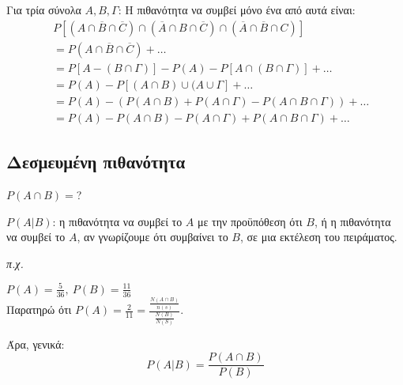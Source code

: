 \documentclass[11pt,a4paper,titlepage,draft]{article}
\begin{document}
\subsubsection{}
Για τρία σύνολα \(A,B, \Gamma \): Η πιθανότητα να συμβεί μόνο ένα από αυτά είναι:
\begin{align*}
& P\left[
\left( A \cap \overline{B} \cap \overline{C} \right) \cap
\left( \overline{A} \cap B \cap \overline{C} \right) \cap
\left( \overline{A} \cap \overline{B} \cap C \right) \right] \\ &=
P(A \cap \overline{B} \cap \overline{C}) + \dots \\ &=
P\left[ A - (B \cap \Gamma )\right]
-P(A)-P \left[ A \cap (B \cap \Gamma ) \right] + \dots
\\ &=
P(A) - P \left[ (A \cap B) \cup (A \cup \Gamma \right]+ \dots  \\ &=
P(A) - \left( P(A \cap B) + P(A \cap \Gamma) - P(A\cap B\cap \Gamma ) \right)+ \dots  \\\ &=
P(A) - P(A \cap B) - P(A \cap \Gamma) + P(A \cap B \cap \Gamma)+ \dots
\end{align*}

\subsection{Δεσμευμένη πιθανότητα}
\(P(A\cap B) =\)?

\(P(A|B)\): η πιθανότητα να συμβεί το $A$ με την προϋπόθεση ότι $B$, ή η πιθανότητα να συμβεί το $A$, αν γνωρίζουμε ότι συμβαίνει το $B$, σε μια εκτέλεση του πειράματος.

\textit{π.χ.}


\(P(A) = \frac{5}{36},\ P(B) = \frac{11}{36}\) \\
Παρατηρώ ότι \(P(A)=\frac{2}{11} = \frac{\frac{N(A\cap B)}{n(s)}}{\frac{N(B)}{N(S)}}\).

Άρα, γενικά:
\[P \left( A | B \right) = \frac{P(A \cap B)}{P(B)} \]
\end{document}
